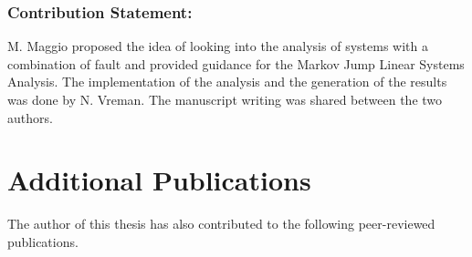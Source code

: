 \subsubsection*{Contribution Statement:}%
%
M. Maggio proposed the idea of looking into the analysis of systems with a combination of fault and provided guidance for the Markov Jump Linear Systems Analysis. The implementation of the analysis and the generation of the results was done by N. Vreman. The manuscript writing was shared between the two authors.



\section{Additional Publications}%
\label{sec:additional-publications}%
%
The author of this thesis has also contributed to the following peer-reviewed publications.

\begin{quote}
\end{quote}

\begin{quote}
\end{quote}

\begin{quote}
\end{quote}

\begin{quote}
\end{quote}

\begin{quote}
\end{quote}
